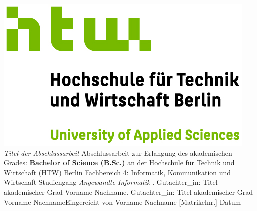 \documentclass[oneside,bibliography=totocnumbered,BCOR=5mm]{scrbook}%
\theoremstyle{definition}
\theoremstyle{definition}
\theoremstyle{definition}
\theoremstyle{definition}
\theoremstyle{definition}
\theoremstyle{definition}
\begin{document}
\begin{titlepage}
\begin{center}
\includegraphics{HTW_Berlin_Logo_farbig.jpg}
\linebreak[4]
\linebreak[4]
\linebreak[4]
\linebreak[4]
\textit{\large Titel der Abschlussarbeit}
\linebreak[4]
\linebreak[4]
\linebreak[4]
Abschlussarbeit 
\linebreak[4]
\linebreak[4]
zur Erlangung des akademischen Grades: 
\linebreak[4]
\linebreak[4]
\textbf{Bachelor of Science (B.Sc.)}
\linebreak[4]
\linebreak[4]
an der
\linebreak[4]
\linebreak[4]
Hochschule f\"ur Technik und Wirtschaft (HTW) Berlin
\linebreak[4]
Fachbereich 4: Informatik, Kommunikation und Wirtschaft
\linebreak[4]
Studiengang \textit{Angewandte Informatik}
\linebreak[4]
\linebreak[4]
. Gutachter\_in: Titel akademischer Grad Vorname Nachname. Gutachter\_in: Titel akademischer Grad Vorname Nachname\linebreak[4]
\linebreak[4]
\linebreak[4]
\linebreak[4]
\linebreak[4]
Eingereicht von Vorname Nachname [Matrikelnr.]
\linebreak[4]
\linebreak[4]
\linebreak[4]
\linebreak[4]
Datum

\end{center}
\end{titlepage}
\newpage    %
\end{document}
